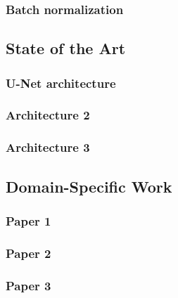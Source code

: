   \subsubsection{Batch normalization}

\subsection{State of the Art}
\label{sec:cnn-architectures}
  \subsubsection{U-Net architecture}
  \subsubsection{Architecture 2}
  \subsubsection{Architecture 3}

\subsection{Domain-Specific Work}
\label{sec:remote-sensing-research}
  \subsubsection{Paper 1}
  \subsubsection{Paper 2}
  \subsubsection{Paper 3}
